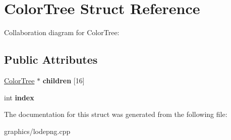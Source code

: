\hypertarget{struct_color_tree}{\section{Color\+Tree Struct Reference}
\label{struct_color_tree}
}


Collaboration diagram for Color\+Tree\+:
\subsection*{Public Attributes}
\begin{DoxyCompactItemize}
\item 
\hypertarget{struct_color_tree_a46a3b1d9239f5fd467ec97cd067b9a96}{\hyperlink{struct_color_tree}{Color\+Tree} $\ast$ {\bfseries children} \mbox{[}16\mbox{]}}\label{struct_color_tree_a46a3b1d9239f5fd467ec97cd067b9a96}

\item 
\hypertarget{struct_color_tree_ab3836a4a5981a7cf4ef553d25d9b0361}{int {\bfseries index}}\label{struct_color_tree_ab3836a4a5981a7cf4ef553d25d9b0361}

\end{DoxyCompactItemize}


The documentation for this struct was generated from the following file\+:\begin{DoxyCompactItemize}
\item 
graphics/lodepng.\+cpp\end{DoxyCompactItemize}

